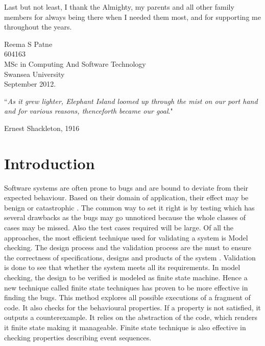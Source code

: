\documentclass[a4paper,12pt]{report}
\begin{document}
\begin{onehalfspacing}
 Last but not least, I thank the Almighty, my parents and all other family members for always being there when I needed them most, and for supporting me throughout the years.
\begin{flushright}
Reema S Patne\\
604163\\
MSc in Computing And Software Technology\\
Swansea University\\
September 2012.
\end{flushright}
 \clearpage
``\textit{As it grew lighter, Elephant Island loomed up through the mist on our port hand
and for various reasons, thenceforth became our goal}."
\begin{flushright}
Ernest Shackleton, 1916
\end{flushright}

\tableofcontents

\chapter{Introduction}
\label{Intro}

Software systems are often prone to bugs and are bound to deviate from their expected behaviour. Based on their domain of application, their effect may be benign or catastrophic \cite{Jackson2000}. The common way to set it right is by testing which has several drawbacks as the bugs may go unnoticed because the whole classes of cases may be missed. Also the test cases required will be large. Of all the approaches, the most efficient technique used for validating a system is Model checking. The design process and the validation process are the must to ensure the correctness of specifications, designs and products of the system \cite{ErichGamma1995}. Validation is done to see that whether the system meets all its requirements. In model checking, the design to be verified is modeled as finite state machine. Hence a new technique called finite state techniques has proven to be more effective in finding the bugs. This method explores all possible executions of a fragment of code. It also checks for the behavioural properties. If a property is not satisfied, it outputs a counterexample. It relies on the abstraction of the code, which renders it finite state making it manageable. Finite state technique is also effective in checking properties describing event sequences\cite{Vaziri-Farahani2004}. 


\end{onehalfspacing}
\end{document}

